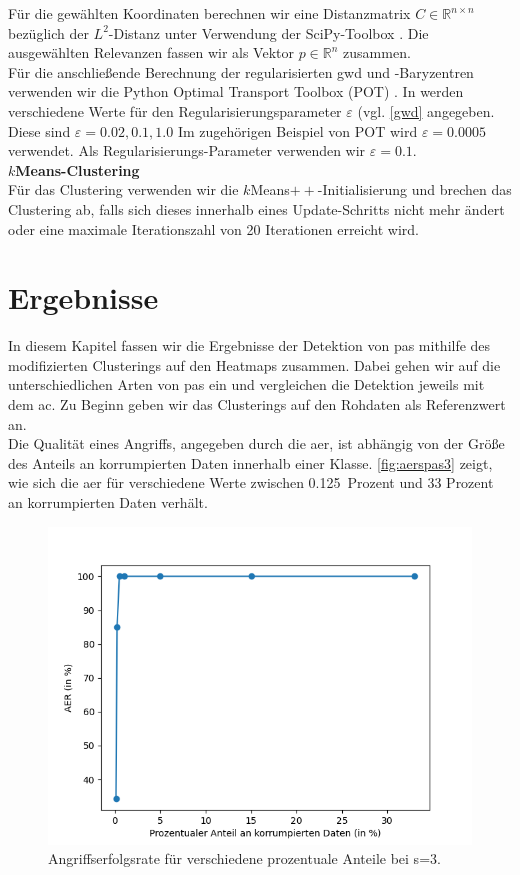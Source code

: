 \documentclass[twoside, 12pt,a4paper]{book}
\numberwithin{equation}{section}
\begin{document}
	\noindent Für die gewählten Koordinaten berechnen wir eine Distanzmatrix $C \in \mathbb{R}^{n \times n}$ bezüglich der $L^2$-Distanz unter Verwendung der SciPy-Toolbox \cite{scipy}.
	Die ausgewählten Relevanzen fassen wir als Vektor $p \in \mathbb{R}^n$ zusammen.\\
	
	\noindent Für die anschließende Berechnung der regularisierten \ac{gwd} und -Baryzentren verwenden wir die Python Optimal Transport Toolbox (POT) \cite{pot}. In \cite{cuturi2013sinkhorn} werden verschiedene Werte für den Regularisierungsparameter $\varepsilon$ (vgl. \autoref{gwd} angegeben. Diese sind $\varepsilon = 0.02, 0.1, 1.0$ Im zugehörigen Beispiel von POT \cite{pot_example} wird $\varepsilon = 0.0005$ verwendet. Als Regularisierungs-Parameter verwenden wir $\varepsilon=0.1$.\\	
	
	
	
	\noindent\textbf{$k$Means-Clustering}\\
	Für das Clustering verwenden wir die $k$Means$++$-Initialisierung und brechen das Clustering ab, falls sich dieses innerhalb eines Update-Schritts nicht mehr ändert oder eine maximale Iterationszahl von 20 Iterationen erreicht wird.
	
	
	
	\section{Ergebnisse} \label{chapter_comparisons}
	
	In diesem Kapitel fassen wir die Ergebnisse der Detektion von \acp{pa} mithilfe des modifizierten Clusterings auf den Heatmaps zusammen. Dabei gehen wir auf die unterschiedlichen Arten von \acp{pa} ein und vergleichen die Detektion jeweils mit dem \ac{ac}. Zu Beginn geben wir das Clusterings auf den Rohdaten als Referenzwert an.\\
	
	\noindent Die Qualität eines Angriffs, angegeben durch die \ac{aer}, ist abhängig von der Größe des Anteils an korrumpierten Daten innerhalb einer Klasse. \autoref{fig:aerspas3} zeigt, wie sich die \ac{aer} für verschiedene Werte zwischen 0.125~Prozent und 33 Prozent an korrumpierten Daten verhält. 

	\begin{figure}[h]
		\centering
		\includegraphics[width=0.5\linewidth]{AER_SPAs3.png}
		\caption{Angriffserfolgsrate für verschiedene prozentuale Anteile bei s=3.}
		\label{fig:aerspas3}
	\end{figure}
	
\end{document}
